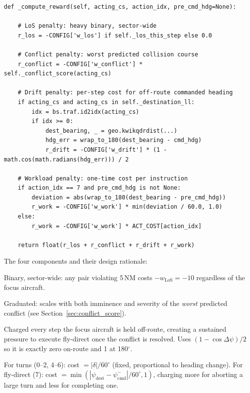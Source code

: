 \documentclass[11pt, a4paper]{article}
\begin{document}
\begin{lstlisting}[caption={Reward function --- four additive negative terms.}]
def _compute_reward(self, acting_cs, action_idx, pre_cmd_hdg=None):

    # LoS penalty: heavy binary, sector-wide
    r_los = -CONFIG['w_los'] if self._los_this_step else 0.0

    # Conflict penalty: worst predicted collision course
    r_conflict = -CONFIG['w_conflict'] * self._conflict_score(acting_cs)

    # Drift penalty: per-step cost for off-route commanded heading
    if acting_cs and acting_cs in self._destination_ll:
        idx = bs.traf.id2idx(acting_cs)
        if idx >= 0:
            dest_bearing, _ = geo.kwikqdrdist(...)
            hdg_err = wrap_to_180(dest_bearing - cmd_hdg)
            r_drift = -CONFIG['w_drift'] * (1 - math.cos(math.radians(hdg_err))) / 2

    # Workload penalty: one-time cost per instruction
    if action_idx == 7 and pre_cmd_hdg is not None:
        deviation = abs(wrap_to_180(dest_bearing - pre_cmd_hdg))
        r_work = -CONFIG['w_work'] * min(deviation / 60.0, 1.0)
    else:
        r_work = -CONFIG['w_work'] * ACT_COST[action_idx]

    return float(r_los + r_conflict + r_drift + r_work)
\end{lstlisting}

The four components and their design rationale:

\begin{description}[noitemsep, leftmargin=0pt]
  \item[$r_\text{LoS}$] Binary, sector-wide: any pair violating 5\,NM costs
    $-w_\text{LoS} = -10$ regardless of the focus aircraft.
  \item[$r_\text{conflict}$] Graduated: scales with both imminence and severity
    of the \emph{worst} predicted conflict (see Section~\ref{sec:conflict_score}).
  \item[$r_\text{drift}$] Charged every step the focus aircraft is held off-route,
    creating a sustained pressure to execute fly-direct once the conflict is resolved.
    Uses $(1-\cos\Delta\psi)/2$ so it is exactly zero on-route and 1 at 180$^\circ$.
  \item[$r_\text{work}$] For turns (0--2, 4--6): cost $= |\delta|/60^\circ$ (fixed,
    proportional to heading change).
    For fly-direct (7): cost $= \min(|\psi_\text{dest} - \psi_\text{cmd}^-| / 60^\circ, 1)$,
    charging more for aborting a large turn and less for completing one.
\end{description}
\end{document}
